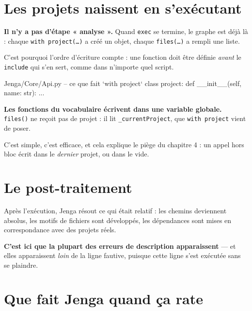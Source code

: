 \section{Les projets naissent en s'exécutant}

\begin{nkretenir}
\textbf{Il n'y a pas d'étape « analyse ».} Quand \texttt{exec} se termine, le
graphe est déjà là : chaque \texttt{with project(\dots)} a créé un objet, chaque
\texttt{files(\dots)} a rempli une liste.

C'est pourquoi l'ordre d'écriture compte : une fonction doit être définie
\emph{avant} le \texttt{include} qui s'en sert, comme dans n'importe quel script.
\end{nkretenir}

\begin{nkcode}{Jenga/Core/Api.py -- ce que fait `with project`}
class project:
    def __init__(self, name: str):
        ...
\end{nkcode}

\begin{nkretenir}
\textbf{Les fonctions du vocabulaire écrivent dans une variable globale.}
\texttt{files()} ne reçoit pas de projet : il lit \texttt{\_currentProject}, que
\texttt{with project} vient de poser.

C'est simple, c'est efficace, et cela explique le piège du chapitre 4 : un appel
hors bloc écrit dans le \emph{dernier} projet, ou dans le vide.
\end{nkretenir}

\section{Le post-traitement}

\begin{nkretenir}
Après l'exécution, Jenga résout ce qui était relatif : les chemins deviennent
absolus, les motifs de fichiers sont développés, les dépendances sont mises en
correspondance avec des projets réels.

\textbf{C'est ici que la plupart des erreurs de description apparaissent} --- et
elles apparaissent \emph{loin} de la ligne fautive, puisque cette ligne s'est
exécutée sans se plaindre.
\end{nkretenir}

\section{Que fait Jenga quand ça rate}

